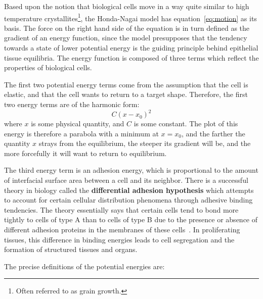 Based upon the notion that biological cells move in a way quite similar to high temperature crystallites\footnote{Often referred to as grain growth.}, the Honda-Nagai model has equation~\ref{eq:motion} as its basis. The force on the right hand side of the equation is in turn defined as the gradient of an energy function, since the model presupposes that the tendency towards a state of lower potential energy is the guiding principle behind epithelial tissue equilibria. The energy function is composed of three terms which reflect the properties of biological cells.

The first two potential energy terms come from the assumption that the cell is elastic, and that the cell wants to return to a target shape. Therefore, the first two energy terms are of the harmonic form: 
\begin{equation}
C(x-x_0)^2
\end{equation}
where $x$ is some physical quantity, and $C$ is some constant. The plot of this energy is therefore a parabola with a minimum at $x =  x_0$, and the farther the quantity $x$ strays from the equilibrium, the steeper its gradient will be, and the more forcefully it will want to return to equilibrium.

The third energy term is an adhesion energy, which is proportional to the amount of interfacial surface area between a cell and its neighbor. There is a successful theory in biology called the \textbf{differential adhesion hypothesis} which attempts to account for certain cellular distribution phenomena through adhesive binding tendencies. The theory essentially says that certain cells tend to bond more tightly to cells of type A than to cells of type B due to the presence or absence of different adhesion proteins in the membranes of these cells~\cite{DA}. In proliferating tissues, this difference in binding energies leads to cell segregation and the formation of structured tissues and organs. 

The precise definitions of the potential energies are:

